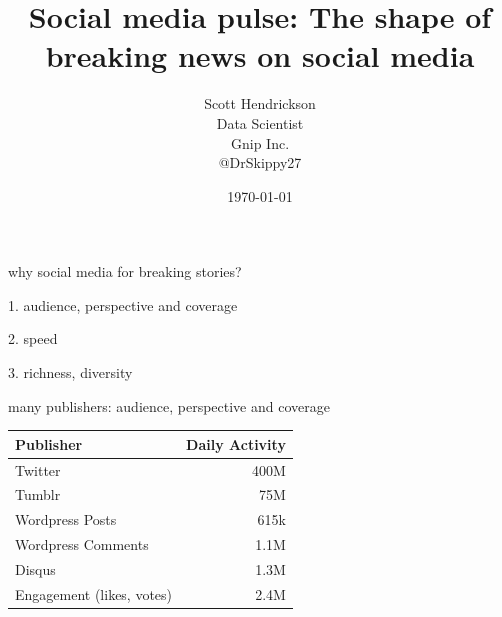 \documentclass{beamer}
\begin{document}
\title{Social media pulse: The shape of breaking news on social media}  
\author{Scott Hendrickson \\ Data Scientist  \\ Gnip Inc.\\ @DrSkippy27}
\date{\today} 


\begin{frame}
\titlepage
\end{frame}


\begin{frame}
\begin{center}
{\Huge why social media for breaking stories? }
\end{center}
\end{frame}


\begin{frame}
\begin{center}
{\Huge 1. audience, perspective and coverage }
\end{center}
\end{frame}

\begin{frame}
\begin{center}
{\Huge 2. speed }
\end{center}
\end{frame}

\begin{frame}
\begin{center}
{\Huge 3. richness, diversity }
\end{center}
\end{frame}


\begin{frame}
\begin{center}
{\Huge many publishers: audience, perspective and coverage }
\end{center}
\end{frame}


\begin{frame} 
\begin{table}
\begin{tabular}{l|r}
\hline
   {Publisher}   &   {Daily Activity}   \\
\hline 
    Twitter      &      400M   \\
    Tumblr      &        75M   \\
    Wordpress Posts &     615k   \\
    Wordpress Comments & 1.1M \\
    Disqus       &       1.3M  \\
    Engagement (likes, votes) & 2.4M  \\
\hline
\end{tabular}
\end{table}
\end{frame}
\end{document}
